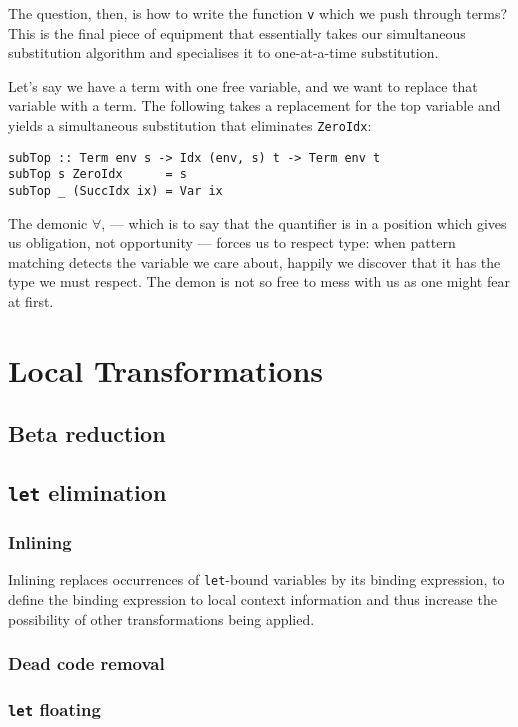 The question, then, is how to write the function \texttt{v} which we push
through terms? This is the final piece of equipment that essentially takes our
simultaneous substitution algorithm and specialises it to one-at-a-time
substitution.

Let's say we have a term with one free variable, and we want to replace that
variable with a term. The following takes a replacement for the top variable and
yields a simultaneous substitution that eliminates \texttt{ZeroIdx}:
%
\begin{lstlisting}[style=haskell]
subTop :: Term env s -> Idx (env, s) t -> Term env t
subTop s ZeroIdx      = s
subTop _ (SuccIdx ix) = Var ix
\end{lstlisting}
%
The demonic $\forall$, --- which is to say that the quantifier is in a position
which gives us obligation, not opportunity --- forces us to respect type: when
pattern matching detects the variable we care about, happily we discover that it
has the type we must respect. The demon is not so free to mess with us as one
might fear at first.



\section{Local Transformations}
\subsection{Beta reduction}
\subsection{\texttt{let} elimination}
\subsubsection{Inlining}
\label{sec:inlining}

Inlining replaces occurrences of \texttt{let}-bound variables by its binding
expression, to define the binding expression to local context information and
thus increase the possibility of other transformations being applied.


\subsubsection{Dead code removal}
\subsubsection{\texttt{let} floating}
